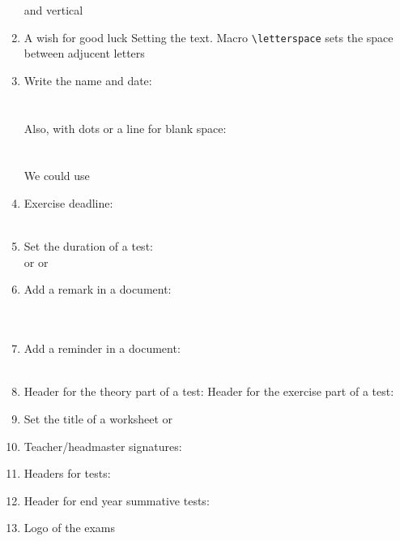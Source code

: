 \documentclass[12pt,a4page]{article}
\begin{document}
\begin{enumerate}

  and vertical
  
\item A wish for good luck
  \wish
  Setting the text. Macro \verb/\letterspace/ sets the space between adjucent letters
  \makeatletter
  \def\schl@wish{\letterspace{10} ΚΑΛΗ ΤΥΧΗ}
  \makeatother
  \wish
\item Write the name and date:\\
  \fullname\\
  \datefield \\[1ex]
  Also, with dots or a line for blank space:\\
  \\ \datefield{\blankspace{10em}}\\[1ex]
  We could use \\
  \datefield{\getdate}
\item Exercise deadline:\\
  \\
\item Set the duration of a test:\\  or  or 
\item Add a remark in a document:\\
  \\
  \\
\item Add a reminder in a document:\\
  \\
\item Header for the theory part of a test: \theorypart
  Header for the exercise part of a test: \exercisepart
\item Set the title of a worksheet
  \worksheethd{}
  or
\item Teacher/headmaster signatures:\\
  \hfill
\item Headers for tests:
  \examhd{}
\item Header for end year summative tests:
\item Logo of the  exams


\end{enumerate}
\end{document}
